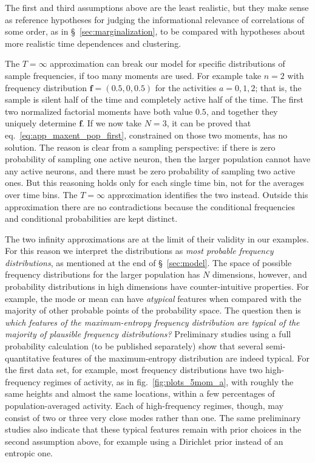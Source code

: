 \documentclass[\ifafour a4paper,12pt,\else a5paper,10pt,\fi%
onecolumn,oneside,article,%
british%
]{memoir}
\theoremstyle{remark}
\theoremstyle{innote}
\renewcommand*{\|}{\nonscript\,\vert\nonscript\;\mathopen{}}
\newcommand*{\sect}{\S}%
\newcommand*{\eqn}{eq.}%
\newcommand*{\fig}{fig.}%
\newcommand*{\yav}{a}
\newcommand*{\yff}{f}
\newcommand*{\yf}{\bm{\yff}}
\newcommand*{\ya}{\yav}%
\begin{document}
\medskip

The first and third assumptions above are the least realistic, but they
make sense as reference hypotheses for judging the informational relevance
of correlations of some order, as in \sect~\ref{sec:marginalization}, to be
compared with hypotheses about more realistic time dependences and
clustering. %

The $T= \infty$ approximation can break our model for specific
distributions of sample frequencies, if too many moments are used. For
example take $n=2$ with frequency distribution $\yf=(0.5,0,0.5)$ for the
activities $\ya=0,1,2$; that is, the sample is silent half of the time and
completely active half of the time. The first two normalized factorial
moments have both value $0.5$, and together they uniquely determine $\yf$.
If we now take $N=3$, it can be proved that
\eqn~\eqref{eq:app_maxent_pop_first}, constrained on those two moments, has
no solution. The reason is clear from a sampling perspective: if there is
zero probability of sampling one active neuron, then the larger population
cannot have any active neurons, and there must be zero probability of
sampling two active ones. But this reasoning holds only for each single
time bin, not for the averages over time bins. The $T=\infty$ approximation
identifies the two instead. Outside this approximation there are no
contradictions because the conditional frequencies and conditional
probabilities are kept distinct.

The two infinity approximations are at the limit of their validity in our
examples. For this reason we interpret the distributions as \emph{most
  probable frequency distributions}, as mentioned at the end of
\sect~\ref{sec:model}. The space of possible frequency distributions for
the larger population has $N$ dimensions, however, and probability
distributions in high dimensions have counter-intuitive properties. For
example, the mode or mean can have \emph{atypical} features when compared
with the majority of other probable points of the probability space. The
question then is \emph{which features of the maximum-entropy frequency
  distribution are typical of the majority of plausible frequency
  distributions?} Preliminary studies using a full probability calculation
(to be published separately) show that several semi-quantitative features
of the maximum-entropy distribution are indeed typical. For the first data
set, for example, most frequency distributions have two high-frequency
regimes of activity, as in \fig~\ref{fig:plots_5mom_a}, with roughly the
same heights and almost the same locations, within a few percentages of
population-averaged activity. Each of high-frequency regimes, though, may
consist of two or three very close modes rather than one. The same
preliminary studies also indicate that these typical features remain with
prior choices in the second assumption above, for example using a Dirichlet
prior instead of an entropic one.
\end{document}
